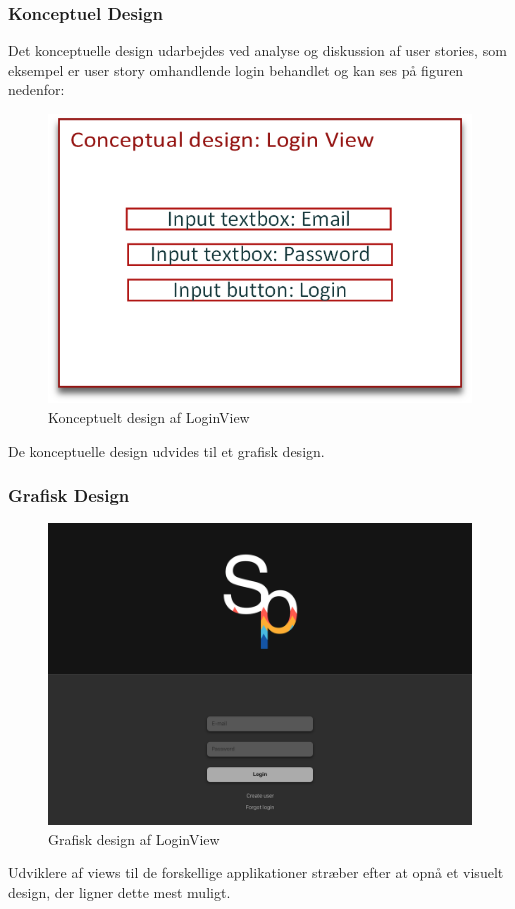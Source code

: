 \subsubsection{Konceptuel Design}
Det konceptuelle design udarbejdes ved analyse og diskussion af user stories, som eksempel er user story omhandlende login behandlet og kan ses på figuren nedenfor:

\begin{figure}
	\centering
	\includegraphics[width=0.5\linewidth]{figs/design/concuptuel_design_loginview}
	\caption{Konceptuelt design af LoginView}
	\label{fig:conceptualdesignview}
\end{figure}

De konceptuelle design udvides til et grafisk design.

\subsubsection{Grafisk Design}
\begin{figure}
	\centering
	\includegraphics[width=0.5\linewidth]{figs/design/DesktopHDLogin}
	\caption{Grafisk design af LoginView}
	\label{fig:graphicaldesign}
\end{figure}

Udviklere af views til de forskellige applikationer stræber efter at opnå et visuelt design, der ligner dette mest muligt.
